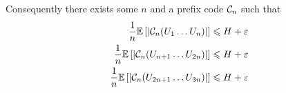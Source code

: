 Consequently there exists some $n$ and a prefix code $\mathcal{C}_n$ such that
\[
    \begin{aligned}
        \frac{1}{n}\mathbb{E}\left[ \left\lvert\mathcal{C}_n(U_1\ldots U_n)\right\rvert \right] &\leqslant H+\varepsilon\\
        \frac{1}{n}\mathbb{E}\left[ \left\lvert\mathcal{C}_n(U_{n+1}\ldots U_{2n})\right\rvert \right] &\leqslant H+\varepsilon\\
        \frac{1}{n}\mathbb{E}\left[ \left\lvert\mathcal{C}_n(U_{2n+1}\ldots U_{3n})\right\rvert \right] &\leqslant H+\varepsilon
    \end{aligned}
\]